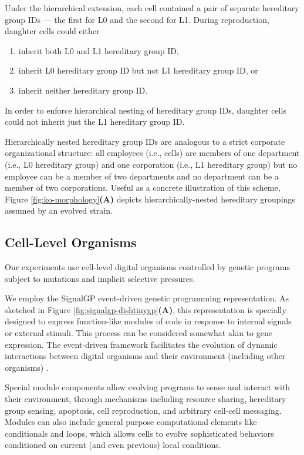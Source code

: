 Under the hierarchical extension, each cell contained a pair of separate hereditary group IDs --- the first for L0 and the second for L1.
During reproduction, daughter cells could either
\begin{enumerate}
\item inherit both L0 and L1 hereditary group ID,
\item inherit L0 hereditary group ID but not L1 hereditary group ID, or
\item inherit neither hereditary group ID.
\end{enumerate}
In order to enforce hierarchical nesting of hereditary group IDs, daughter cells could not inherit just the L1 hereditary group ID.

Hierarchically nested hereditary group IDs are analogous to a strict corporate organizational structure: all employees (i.e., cells) are members of one department (i.e., L0 hereditary group) and one corporation (i.e., L1 hereditary group) but no employee can be a member of two departments and no department can be a member of two corporations.
Useful as a concrete illustration of this scheme, Figure \ref{fig:ko-morphology}\textbf{(A)} depicts hierarchically-nested hereditary groupings assumed by an evolved strain.

\subsection{Cell-Level Organisms}

Our experiments use cell-level digital organisms controlled by genetic programs subject to mutations and implicit selective pressures.

We employ the SignalGP event-driven genetic programming representation.
As sketched in Figure \ref{fig:signalgp-dishtinygp}\textbf{(A)}, this representation is specially designed to express function-like modules of code in response to internal signals or external stimuli.
This process can be considered somewhat akin to gene expression.
The event-driven framework facilitates the evolution of dynamic interactions between digital organisms and their environment (including other organisms) \citep{lalejini2018evolving}.

Special module components allow evolving programs to sense and interact with their environment, through mechanisms including resource sharing, hereditary group sensing, apoptosis, cell reproduction, and arbitrary cell-cell messaging.
Modules can also include general purpose computational elements like conditionals and loops, which allows cells to evolve sophisticated behaviors conditioned on current (and even previous) local conditions.

